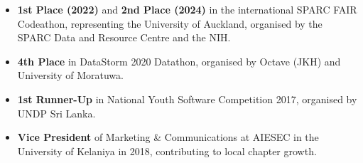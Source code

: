 \documentclass[12pt,a4paper,withhyper]{altacv}
\begin{document}
\begin{itemize}
    \item \textbf{1st Place (2022)} and \textbf{2nd Place (2024)} in the international SPARC FAIR Codeathon, representing the University of Auckland, organised by the SPARC Data and Resource Centre and the NIH.
    \item \textbf{4th Place} in DataStorm 2020 Datathon, organised by Octave (JKH) and University of Moratuwa.
    \item \textbf{1st Runner-Up} in National Youth Software Competition 2017, organised by UNDP Sri Lanka.

    \item \textbf{Vice President} of Marketing \& Communications at AIESEC in the University of Kelaniya in 2018, contributing to local chapter growth.



\end{itemize}



\medskip






\end{document}
